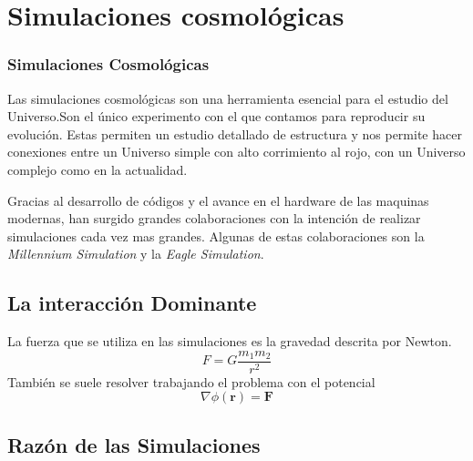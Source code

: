 \documentclass{beamer}
\begin{document}
\section{Simulaciones cosmológicas}
	\begin{frame}
		\frametitle{Simulaciones Cosmológicas}
		Las simulaciones cosmológicas son una herramienta esencial para el estudio del Universo.Son el único experimento con el que contamos para reproducir su evolución. Estas permiten un estudio detallado de estructura y nos permite hacer conexiones entre un Universo simple con alto corrimiento al rojo, con un Universo complejo como en la actualidad.
		
		Gracias al desarrollo de códigos y el avance en el hardware de las maquinas modernas, han surgido grandes colaboraciones con la intención de realizar simulaciones cada vez mas grandes. Algunas de estas colaboraciones son la \textit{Millennium Simulation} y la \textit{Eagle Simulation}.
	\end{frame}
\subsection[La interacción dominante en las simulaciones]{La interacción Dominante}
	\begin{frame}
		La fuerza que se utiliza en las simulaciones es la gravedad descrita por Newton.
		\begin{equation}
		    F = G \frac{m_1 m_2}{r^2}
		    \label{eq:Gravedad-Newton}
		\end{equation}
		También se suele resolver trabajando el problema con el potencial
		\begin{equation}
		    \nabla \phi(\mathbf{r}) = \mathbf{F}
		    \label{eq:potencial-gravitacional}
		\end{equation}
	\end{frame}
	

\subsection[Una razón práctica para las simulaciones]{Razón de las Simulaciones}
\end{document}
